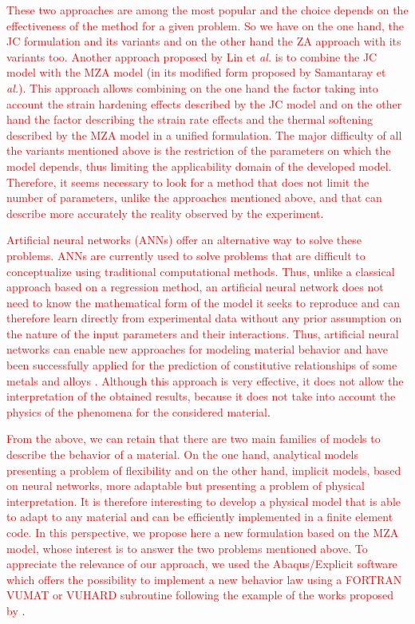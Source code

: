 \documentclass[twoside,english,1p,final,sort&compress]{elsarticle}
\makeatletter
\theoremstyle{plain}
\newcommand*{\eal}{et \emph{al.}\@\xspace}
\makeatother
\begin{document}
\textcolor{red}{These two approaches are among the most popular and the choice depends on the effectiveness of the method for a given problem. So we have on the one hand, the JC formulation and its variants and on the other hand the ZA approach with its variants too. Another approach proposed by Lin \eal \cite{Lin-2010-Modified-JC} is to combine the JC model with the MZA model (in its modified form proposed by Samantaray \eal \cite{Samantaray-2009-Thermo-viscoplastic}). This approach allows combining on the one hand the factor taking into account the strain hardening effects described by the JC model and on the other hand the factor describing the strain rate effects and the thermal softening described by the MZA model in a unified formulation. The major difficulty of all the variants mentioned above is the restriction of the parameters on which the model depends, thus limiting the applicability domain of the developed model. Therefore, it seems necessary to look for a method that does not limit the number of parameters, unlike the approaches mentioned above, and that can describe more accurately the reality observed by the experiment}.

\textcolor{red}{Artificial neural networks (ANNs) offer an alternative way to solve these problems. ANNs are currently used to solve problems that are difficult to conceptualize using traditional computational methods. Thus, unlike a classical approach based on a regression method, an artificial neural network does not need to know the mathematical form of the model it seeks to reproduce and can therefore learn directly from experimental data without any prior assumption on the nature of the input parameters and their interactions. Thus, artificial neural networks can enable new approaches for modeling material behavior and have been successfully applied for the prediction of constitutive relationships of some metals and alloys \cite{Lin-2008-ANN, Lu-2011-ANN, Ashtiani-2016-CSP, Huang-2021-CMM}. Although this approach is very effective, it does not allow the interpretation of the obtained results, because it does not take into account the physics of the phenomena for the considered material}.

\textcolor{red}{From the above, we can retain that there are two main families of models to describe the behavior of a material. On the one hand, analytical models presenting a problem of flexibility and on the other hand, implicit models, based on neural networks, more adaptable but presenting a problem of physical interpretation. It is therefore interesting to develop a physical model that is able to adapt to any material and can be efficiently implemented in a finite element code. In this perspective, we propose here a new formulation based on the MZA model, whose interest is to answer the two problems mentioned above. To appreciate the relevance of our approach, we used the Abaqus/Explicit software which offers the possibility to implement a new behavior law using a FORTRAN VUMAT or VUHARD subroutine following the example of the works proposed by \cite{Gao-2007-FRT, JansenVanRensburg-2012-TSV, Duc-Toan-2012-MJC, Ming-2018-ERV}}.
\end{document}
